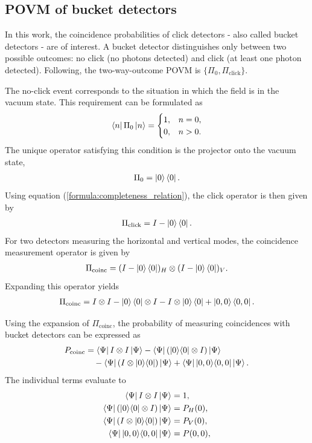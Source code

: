 \documentclass[%
 reprint,
 amsmath,amssymb,
 aps,
twocolumn
]{revtex4-2}
\begin{document}
\subsection{POVM of bucket detectors}
In this work, the coincidence probabilities of click detectors - also called bucket detectors - are of interest. A bucket detector distinguishes only between two possible outcomes: no click (no photons detected) and click (at least one photon detected). Following, the two-way-outcome POVM is $\{\Pi_0, \Pi_{\text{click}}\}$.

The no-click event corresponds to the situation in which the field is in the vacuum state. This requirement can be formulated as
\begin{align}
    \bra{n}\Pi_0\ket{n} =
    \begin{cases}
        1, & n = 0, \\
        0, & n > 0.
    \end{cases}
\end{align}
The unique operator satisfying this condition is the projector onto the vacuum state,
\begin{align}
    \Pi_0 = \ket{0}\bra{0}.
\end{align}
Using equation (\ref{formula:completeness_relation}), the click operator is then given by
\begin{align}
    \Pi_{\text{click}} = I - \ket{0}\bra{0}.
\end{align}
For two detectors measuring the horizontal and vertical modes, the coincidence measurement operator is given by
\begin{align}
    \Pi_{\text{coinc}} = (I - \ket{0}\bra{0})_H \otimes (I - \ket{0}\bra{0})_V.
\end{align}
Expanding this operator yields
\begin{align}
    \Pi_{\text{coinc}} = I \otimes I 
    - \ket{0}\bra{0} \otimes I 
    - I \otimes \ket{0}\bra{0} 
    + \ket{0,0}\bra{0,0}.
\end{align}

Using the expansion of $\Pi_{\text{coinc}}$, the probability of measuring coincidences with bucket detectors can be expressed as
\begin{align}
P_{\text{coinc}} &= \bra{\Psi} I \otimes I \ket{\Psi}
- \bra{\Psi} (|0\rangle\langle 0| \otimes I) \ket{\Psi} \notag \\
&\quad - \bra{\Psi} (I \otimes |0\rangle\langle 0|) \ket{\Psi}
+ \bra{\Psi} |0,0\rangle\langle 0,0| \ket{\Psi}.
\end{align}
The individual terms evaluate to
\begin{align}
\bra{\Psi} I \otimes I \ket{\Psi} &= 1, \\
\bra{\Psi} (|0\rangle\langle 0| \otimes I) \ket{\Psi} &= P_H(0), \\
\bra{\Psi} (I \otimes |0\rangle\langle 0|) \ket{\Psi} &= P_V(0), \\
\bra{\Psi} |0,0\rangle\langle 0,0| \ket{\Psi} &= P(0,0),
\end{align}
\end{document}
